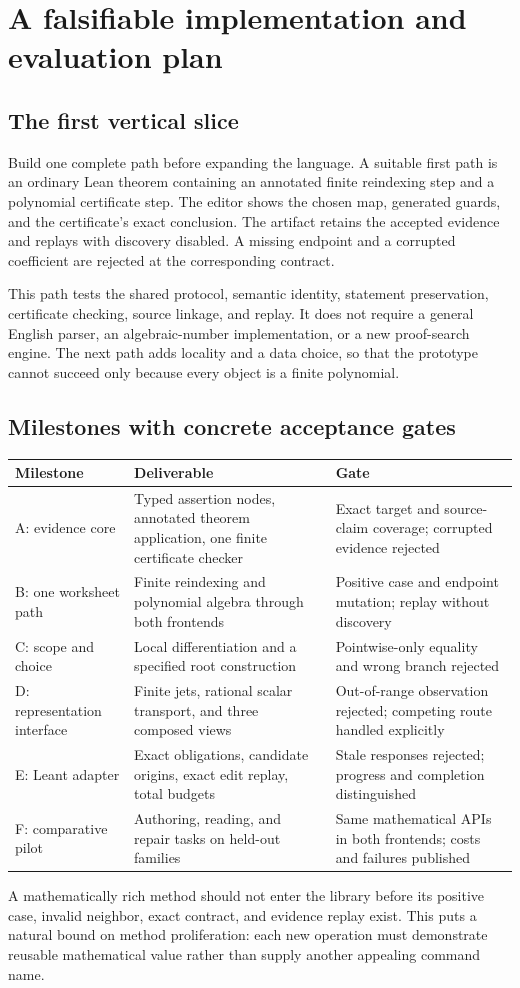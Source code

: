 \documentclass[11pt,a4paper]{article}
\theoremstyle{definition}
\begin{document}
\section{A falsifiable implementation and evaluation plan}
\label{sec:evaluation}
\subsection{The first vertical slice}
Build one complete path before expanding the language. A suitable first path is
an ordinary Lean theorem containing an annotated finite reindexing step and a
polynomial certificate step. The editor shows the chosen map, generated guards,
and the certificate's exact conclusion. The artifact retains the accepted
evidence and replays with discovery disabled. A missing endpoint and a corrupted
coefficient are rejected at the corresponding contract.

This path tests the shared protocol, semantic identity, statement preservation,
certificate checking, source linkage, and replay. It does not require a general
English parser, an algebraic-number implementation, or a new proof-search engine.
The next path adds locality and a data choice, so that the prototype cannot
succeed only because every object is a finite polynomial.

\subsection{Milestones with concrete acceptance gates}
\begin{longtable}{@{}P{.17\textwidth}P{.45\textwidth}P{.30\textwidth}@{}}
\toprule
Milestone & Deliverable & Gate \\
\midrule
\endhead
A: evidence core & Typed assertion nodes, annotated theorem application, one finite certificate checker & Exact target and source-claim coverage; corrupted evidence rejected \\
B: one worksheet path & Finite reindexing and polynomial algebra through both frontends & Positive case and endpoint mutation; replay without discovery \\
C: scope and choice & Local differentiation and a specified root construction & Pointwise-only equality and wrong branch rejected \\
D: representation interface & Finite jets, rational scalar transport, and three composed views & Out-of-range observation rejected; competing route handled explicitly \\
E: Leant adapter & Exact obligations, candidate origins, exact edit replay, total budgets & Stale responses rejected; progress and completion distinguished \\
F: comparative pilot & Authoring, reading, and repair tasks on held-out families & Same mathematical APIs in both frontends; costs and failures published \\
\bottomrule
\end{longtable}
A mathematically rich method should not enter the library before its positive
case, invalid neighbor, exact contract, and evidence replay exist. This puts a
natural bound on method proliferation: each new operation must demonstrate
reusable mathematical value rather than supply another appealing command name.
\end{document}
